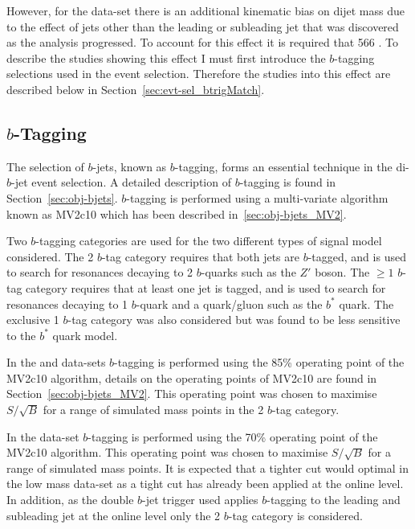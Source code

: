 However, for the \lm{} data-set
there is an additional kinematic bias on dijet mass 
due to the effect of jets other than the leading or subleading jet
that was discovered as the analysis progressed.
To account for this effect it is required that \mjj{} \gt{} 566 \GeV{}.
To describe the studies showing this effect I must first introduce
the $b$-tagging selections used in the \lm{} event selection.
Therefore the studies into this effect are described below in Section~\ref{sec:evt-sel_btrigMatch}.

\subsection{$b$-Tagging}
\label{sec:evt-sel-btag}

The selection of $b$-jets, known as $b$-tagging,
forms an essential technique in the di-$b$-jet event selection.
A detailed description of $b$-tagging is found in Section~\ref{sec:obj-bjets}.
$b$-tagging is performed using a multi-variate algorithm known as MV2c10 which has been described in~\ref{sec:obj-bjets_MV2}.

Two $b$-tagging categories are used for the two different types of signal model considered.
The 2 $b$-tag category requires that both jets are $b$-tagged,
and is used to search for resonances decaying to 2 $b$-quarks such as the $Z'$ boson.
The $\geq 1$ $b$-tag category requires that at least one jet is tagged,
and is used to search for resonances decaying to 1 $b$-quark and a quark/gluon such as the $b^*$ quark.
The exclusive 1 $b$-tag category was also considered but was found to be less sensitive to the $b^*$ quark model.

In the \summer{} and \hm{} data-sets
$b$-tagging is performed using the 85\% operating point of the MV2c10 algorithm,
details on the operating points of MV2c10 are found in Section~\ref{sec:obj-bjets_MV2}.
This operating point was chosen to maximise $S/\sqrt{B}$ for a range of simulated mass points in the 2 $b$-tag category.

In the \lm{} data-set $b$-tagging is performed using the 70\% operating point of the MV2c10 algorithm.
This operating point was chosen to maximise $S/\sqrt{B}$ for a range of simulated mass points.
It is expected that a tighter cut would optimal in the low mass data-set as a tight cut has already been applied at the online level.
In addition, as the double $b$-jet trigger used applies $b$-tagging to the leading and subleading jet at the online level
only the 2 $b$-tag category is considered.

